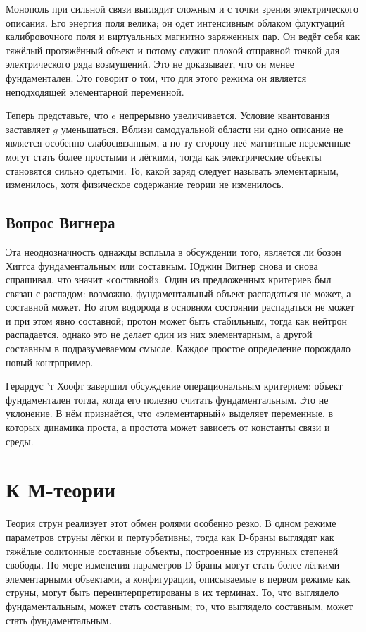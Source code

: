 Монополь при сильной связи выглядит сложным и с точки зрения электрического описания. Его энергия поля велика; он одет интенсивным облаком флуктуаций калибровочного поля и виртуальных магнитно заряженных пар. Он ведёт себя как тяжёлый протяжённый объект и потому служит плохой отправной точкой для электрического ряда возмущений. Это не доказывает, что он менее фундаментален. Это говорит о том, что для этого режима он является неподходящей элементарной переменной.

Теперь представьте, что \(e\) непрерывно увеличивается. Условие квантования заставляет \(g\) уменьшаться. Вблизи самодуальной области ни одно описание не является особенно слабосвязанным, а по ту сторону неё магнитные переменные могут стать более простыми и лёгкими, тогда как электрические объекты становятся сильно одетыми. То, какой заряд следует называть элементарным, изменилось, хотя физическое содержание теории не изменилось.

\subsection{Вопрос Вигнера}

Эта неоднозначность однажды всплыла в обсуждении того, является ли бозон Хиггса фундаментальным или составным. Юджин Вигнер снова и снова спрашивал, что значит «составной». Один из предложенных критериев был связан с распадом: возможно, фундаментальный объект распадаться не может, а составной может. Но атом водорода в основном состоянии распадаться не может и при этом явно составной; протон может быть стабильным, тогда как нейтрон распадается, однако это не делает один из них элементарным, а другой составным в подразумеваемом смысле. Каждое простое определение порождало новый контрпример.

Герардус 'т Хоофт завершил обсуждение операциональным критерием: объект фундаментален тогда, когда его полезно считать фундаментальным. Это не уклонение. В нём признаётся, что «элементарный» выделяет переменные, в которых динамика проста, а простота может зависеть от константы связи и среды.

\section{К М-теории}

Теория струн реализует этот обмен ролями особенно резко. В одном режиме параметров струны лёгки и пертурбативны, тогда как D-браны выглядят как тяжёлые солитонные составные объекты, построенные из струнных степеней свободы. По мере изменения параметров D-браны могут стать более лёгкими элементарными объектами, а конфигурации, описываемые в первом режиме как струны, могут быть переинтерпретированы в их терминах. То, что выглядело фундаментальным, может стать составным; то, что выглядело составным, может стать фундаментальным.

